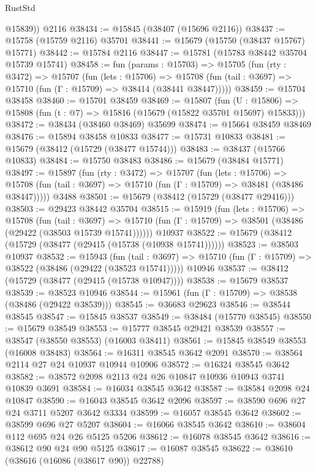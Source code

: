 \begin{lexlean}{RustStd}
\begin{coremodule}
        @15839))
    @2116
@38434 := @15845 (@38407 (@15696 @2116))
@38437 := @15758 (@15759 @2116) @35701
@38441 := @15679 (@15750 (@38437 @15767) @15771)
@38442 := @15784 @2116
@38447 := @15781 (@15783 @38442 @35704 @15739 @15741)
@38458 := fun (params : @15703) =>
  @15705
    (fun (rty : @3472) =>
    @15707
      (fun (lets : @15706) =>
      @15708 (fun (tail : @3697) => @15710 (fun (Γ : @15709) => @38414 (@38441 @38447)))))
@38459 := @15704 @38458
@38460 := @15701 @38459
@38469 := @15807
    (fun (U : @15806) => @15808 (fun (t : @7) => @15816 (@15679 (@15822 @35701 @15697) @15833)))
@38472 := @38434 (@38460 @38469) @35699
@38474 := @15664 @38459 @38469
@38476 := @15894 @38458 @10833
@38477 := @15731 @10833
@38481 := @15679 (@38412 (@15729 (@38477 @15744)))
@38483 := @38437 (@15766 @10833)
@38484 := @15750 @38483
@38486 := @15679 (@38484 @15771)
@38497 := @15897
    (fun (rty : @3472) =>
    @15707
      (fun (lets : @15706) =>
      @15708 (fun (tail : @3697) => @15710 (fun (Γ : @15709) => @38481 (@38486 @38447)))))
    @3488
@38501 := @15679 (@38412 (@15729 (@38477 @29416)))
@38503 := @29423 @38442 @35704
@38515 := @15919
    (fun (lets : @15706) =>
    @15708
      (fun (tail : @3697) =>
      @15710 (fun (Γ : @15709) => @38501 (@38486 (@29422 (@38503 @15739 @15741))))))
    @10937
@38522 := @15679 (@38412 (@15729 (@38477 (@29415 (@15738 (@10938 @15741))))))
@38523 := @38503 @10937
@38532 := @15943
    (fun (tail : @3697) => @15710 (fun (Γ : @15709) => @38522 (@38486 (@29422 (@38523 @15741)))))
    @10946
@38537 := @38412 (@15729 (@38477 (@29415 (@15738 @10947))))
@38538 := @15679 @38537
@38539 := @38523 @10946
@38544 := @15961 (fun (Γ : @15709) => @38538 (@38486 (@29422 @38539)))
@38545 := @36683 @29623
@38546 := @38544 @38545
@38547 := @15845 @38537
@38549 := @38484 (@15770 @38545)
@38550 := @15679 @38549
@38553 := @15777 @38545 @29421 @38539
@38557 := @38547 (@38550 @38553) (@16003 @38411)
@38561 := @15845 @38549 @38553 (@16008 @38483)
@38564 := @16311 @38545 @3642 @2091
@38570 := @38564 @2114 @27 @24 @10937 @10944 @10906
@38572 := @16324 @38545 @3642
@38582 := @38572 @2098 @2113 @24 @26 @10847 @10936 @10943 @3741 @10839 @3691
@38584 := @16034 @38545 @3642
@38587 := @38584 @2098 @24 @10847
@38590 := @16043 @38545 @3642 @2096
@38597 := @38590 @696 @27 @24 @3711 @5207 @3642 @3334
@38599 := @16057 @38545 @3642
@38602 := @38599 @696 @27 @5207
@38604 := @16066 @38545 @3642
@38610 := @38604 @112 @695 @24 @26 @5125 @5206
@38612 := @16078 @38545 @3642
@38616 := @38612 @90 @24 @90 @5125
@38617 := @16087 @38545
@38622 := @38610 (@38616 (@16086 (@38617 @90)) @22788)

\end{coremodule}
\end{lexlean}
